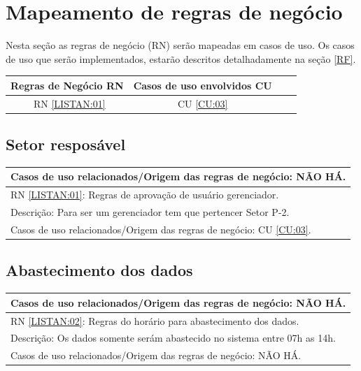 \documentclass[
	12pt,				%
    oneside,			%
	a4paper,			%
	english,			%
	french,				%
	spanish,			%
	brazil,				%
	]{abntex2}
\begin{document}
\section{Mapeamento de regras de negócio}	
Nesta seção as regras de negócio (RN) serão mapeadas em casos de uso. Os casos de uso que serão implementados, estarão descritos detalhadamente na seção \ref{RF}.

\begin{center}
	\begin{tabular}{ |c|c|c|c| } 
		\hline
		Regras de Negócio
		RN  & Casos de uso envolvidos
		CU \\
		\hline
		~RN \ref{LISTAN:01}  &  CU \ref{CU:03}  \\ 
		\hline
		
	\end{tabular}
\end{center}
\subsection{Setor resposável}
\begin{center}
	
	\begin{tabular}{|l|}
		\hline
		Casos de uso relacionados/Origem das regras de negócio: NÃO HÁ.  
		\\ \hline
		RN \ref{LISTAN:01}: Regras de aprovação de usuário gerenciador.                                                                   \\ \hline
		Descrição: Para ser um gerenciador tem que pertencer Setor P-2. \\ \hline
		Casos de uso relacionados/Origem das regras de negócio: CU \ref{CU:03}.                                                                   \\ \hline
	\end{tabular}
	
\end{center}
\subsection{Abastecimento dos dados}

\begin{center}
	
	\begin{tabular}{|l|}
		
		\hline
		Casos de uso relacionados/Origem das regras de negócio: NÃO HÁ.  
		\\ \hline
		RN \ref{LISTAN:02}: Regras do horário para abastecimento dos dados.                                                                   \\ \hline
		Descrição: Os dados somente serám abastecido  no sistema entre 07h as 14h. \\ \hline
		Casos de uso relacionados/Origem das regras de negócio: NÃO HÁ.                                                                  \\ \hline
	\end{tabular}
	
\end{center}
\end{document}

